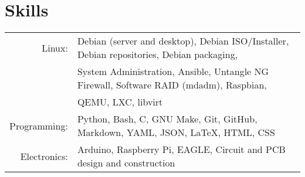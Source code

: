 \documentclass[letterpaper,10pt]{article}
\begin{document}
    \section*{Skills}
        \begin{tabular}{rl}
            \large{Linux:} & Debian (server and desktop), Debian ISO/Installer, Debian repositories, Debian packaging,\\
                           & System Administration, Ansible, Untangle NG Firewall, Software RAID (mdadm), Raspbian,\\
                           & QEMU, LXC, libvirt\\
            \large{Programming:} & Python, Bash, C, GNU Make, Git, GitHub, Markdown, YAML, JSON, \LaTeX, HTML, CSS\\
            \large{Electronics:} & Arduino, Raspberry Pi, EAGLE, Circuit and PCB design and construction\\
        \end{tabular}
\end{document}
